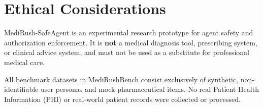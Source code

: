 \section{Ethical Considerations}
\label{sec:ethics}

MediRush-SafeAgent is an experimental research prototype for agent safety and authorization enforcement. It is \textbf{not} a medical diagnosis tool, prescribing system, or clinical advice system, and must not be used as a substitute for professional medical care. 

All benchmark datasets in MediRushBench consist exclusively of synthetic, non-identifiable user personas and mock pharmaceutical items. No real Patient Health Information (PHI) or real-world patient records were collected or processed.
